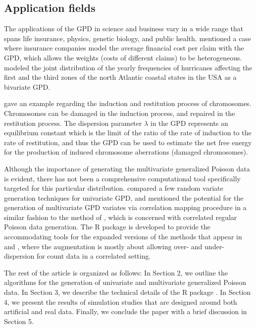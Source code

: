 \subsection{Application fields}  

The applications of the GPD in science and business vary in a wide range that spans life insurance, physics, genetic biology, and public health. \cite{satterthwaite} mentioned a case where insurance companies model the average financial cost per claim with the GPD, which allows the weights (costs of different claims) to be heterogeneous. \cite{vernic} modeled the joint distribution of the yearly frequencies of hurricanes affecting the first and the third zones of the north Atlantic coastal states in the USA as a bivariate GPD.

\cite{consul2006lagrangian} gave an example regarding the induction and restitution process of chromosomes. Chromosomes can be damaged in the induction process, and repaired in the restitution process. The dispersion parameter $\lambda$ in the GPD represents an equilibrium constant which is the limit of the ratio of the rate of induction to the rate of restitution, and thus the GPD can be used to estimate the net free energy for the production of induced chromosome aberrations (damaged chromosomes).

Although the importance of generating the multivariate generalized Poisson data is evident, there has not been a comprehensive computational tool specifically targeted for this particular distribution. \cite{hakan} compared a few random variate generation techniques for univariate GPD, and mentioned the potential for the generation of multivariate GPD variates via correlation mapping procedure in a similar fashion to the method of \cite{yahav2012generating}, which is concerned with correlated regular Poisson data generation. The R package  \citep{RNGforGPD2020} is developed to provide the accommodating tools for the expanded versions of the methods that appear in \cite{hakan} and \cite{yahav2012generating}, where the augmentation is mostly about allowing over- and under-dispersion for count data in a correlated setting.

The rest of the article is organized as follows: In Section 2, we outline the algorithms for the generation of univariate and multivariate generalized Poisson data. In Section 3, we describe the technical details of the R package . In Section 4, we present the results of simulation studies that are designed around both artificial and real data. Finally, we conclude the paper with a brief discussion in Section 5.

